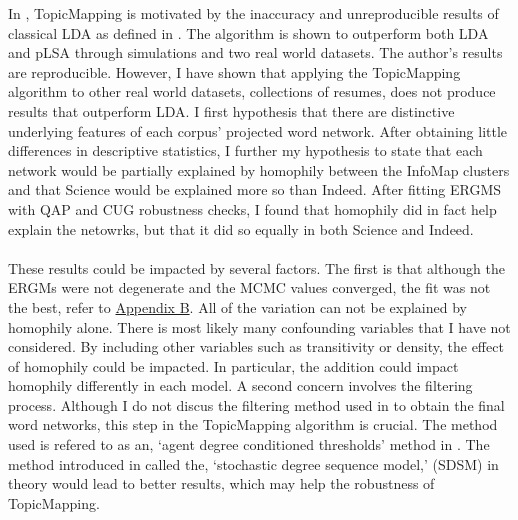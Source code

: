 \documentclass[12pt]{article}
\begin{document}
In \cite{main}, TopicMapping is motivated by the inaccuracy and unreproducible results of classical LDA as defined in \cite{lda}. The algorithm is shown to outperform both LDA and pLSA through simulations and two real world datasets. The author's results are reproducible. However, I have shown that applying the TopicMapping algorithm to other real world datasets, collections of resumes, does not produce results that outperform LDA. I first hypothesis that there are distinctive underlying features of each corpus' projected word network. After obtaining little differences in descriptive statistics, I further my hypothesis to state that each network would be partially explained by homophily between the InfoMap clusters and that Science would be explained more so than Indeed. After fitting ERGMS with QAP and CUG robustness checks, I found that homophily did in fact help explain the netowrks, but that it did so equally in both Science and Indeed. 
\\
\\
These results could be impacted by several factors. The first is that although the ERGMs were not degenerate and the MCMC values converged, the fit was not the best, refer to \hyperlink{B}{Appendix B}. All of the variation can not be explained by homophily alone. There is most likely many confounding variables that I have not considered. By including other variables such as transitivity or density, the effect of homophily could be impacted. In particular, the addition could impact homophily differently in each model. A second concern involves the filtering process. Although I do not discus the filtering method used in \cite{mainExtra} to obtain the final word networks, this step in the TopicMapping algorithm is crucial. The method used is refered to as an, `agent degree conditioned thresholds' method in \cite{filter}. The method introduced in \cite{filter} called the, `stochastic degree sequence model,' (SDSM) in theory would lead to better results, which may help the robustness of TopicMapping. 
\end{document}
